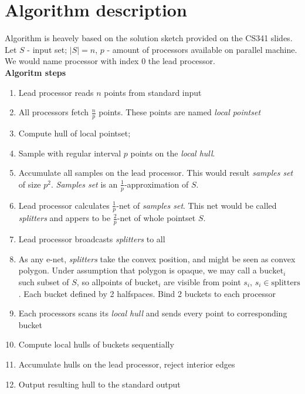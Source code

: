 \documentclass[a4paper]{article}
\begin{document}
\section {Algorithm description}
    Algorithm is heavely based on the solution sketch provided on the CS341 slides.\\
    Let $S$ - input set; $|S| = n$, $p$ - amount of processors available on parallel machine.\\
    We would name processor with index 0 the lead processor.\\
    \textbf {Algoritm steps}
    \begin {enumerate}
        \item Lead processor reads $n$ points from standard input
        \item All processors fetch $\frac n p$ points. These points are named \textit{local pointset}
        \item Compute hull of local pointset;
        \item Sample with regular interval $p$ points on the \textit{local hull}.
        \item Accumulate all samples on the lead processor. This would result \textit{samples set} of size $p^2$. \textit{Samples set} is an $\frac 1 p$-approximation of $S$.
        \item Lead processor calculates $\frac 1 p$-net of \textit{samples set}. This net would be called \textit{splitters} and appers to be $\frac 2 p$-net of whole pointset $S$.
        \item Lead processor broadcasts \textit{splitters} to all
        \item As any e-net, \textit{splitters} take the convex position, and might be seen as convex polygon. Under assumption that polygon is opaque, we may call a $\text{bucket}_i$ such subset of $S$, so allpoints of $\text{bucket}_i$ are visible from point $s_i$, $s_i \in \text{splitters}$. Each bucket defined by 2 halfspaces. Bind 2 buckets to each processor
        \item Each processors scans its \textit{local hull} and sends every point to corresponding bucket
        \item Compute local hulls of buckets sequentially
        \item Accumulate hulls on the lead processor, reject interior edges
        \item Output resulting hull to the standard output
    \end {enumerate}
\end{document}
